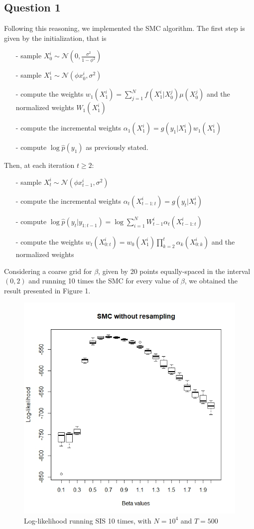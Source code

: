 \documentclass[]{article}
\begin{document}
\subsection*{Question 1}
Following this reasoning, we implemented the SMC algorithm. The first step is given by the initialization, that is 
\begin{enumerate}
	\item[-] sample $X_0^i \sim \mathcal{N}(0, \frac{\sigma^2}{1-\phi^2})$
	\item[-] sample $X_1^i \sim \mathcal{N}(\phi x_0^i,\sigma^2) $ 
	\item[-] compute the weights $w_1(X_1^i) = \sum_{j=1}^{N}f(X_1^i|X_0^j)\mu(X_0^j)$ and the normalized weights $W_1(X_1^i)$
	\item[-] compute the incremental weights $ \alpha_1(X_1^i) = g(y_1|X_1^i)w_1(X_1^i) $
	\item[-] compute $\log \hat{p}(y_1)$ as previously stated. 
\end{enumerate}
Then, at each iteration $t \geq 2$:
\begin{enumerate}
	\item[-] sample $X_t^i \sim \mathcal{N}(\phi x_{t-1}^i,\sigma^2) $
	\item[-] compute the incremental weights $ \alpha_t(X_{t-1:t}^i) = g(y_t|X_t^i) $
	\item[-] compute $\log \hat{p}(y_t|y_{1:t-1})=\log\sum_{i=1}^{N}W_{t-1}^i\alpha_t(X_{t-1:t}^i)$
	\item[-] compute the weights $
	w_t(X_{0:t}^i)=w_0(X_1^i)\prod_{k=2}^{t}\alpha_k(X_{0:k}^i)$ and the normalized weights
\end{enumerate}
Considering a coarse grid for $\beta$, given by 20 points equally-spaced in the interval $(0,2)$ and running 10 times the SMC for every value of $\beta$, we obtained the result presented in Figure 1. 
\begin{figure}
	\includegraphics[width=\columnwidth]{task1/SIS_N_10000_T_500.jpeg}
	\caption{Log-likelihood running SIS 10 times, with $N=10^4$ and $T=500$}
\end{figure}
\end{document}
